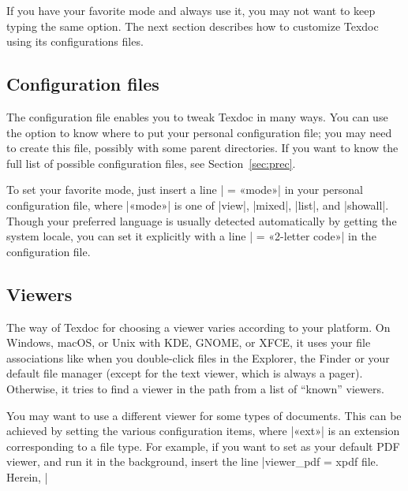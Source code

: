 \documentclass[draft]{texdoc-doc}
\begin{document}
If you have your favorite mode and always use it, you may not want to keep
typing the same option. The next section describes how to customize Texdoc
using its configurations files.

\subsection{Configuration files}
\label{sec:quick-file}

The configuration file enables you to tweak Texdoc in many ways. You can use
the  option to know where to put your personal configuration file;
you may need to create this file, possibly with some parent directories. If you
want to know the full list of possible configuration files, see
Section~\ref{sec:prec}.

To set your favorite mode, just insert a line | = «mode»| in your
personal configuration file, where |«mode»| is one of |view|, |mixed|, |list|,
and |showall|. Though your preferred language is usually detected automatically
by getting the system locale, you can set it explicitly with a line
| = «2-letter code»| in the configuration file.


\subsection{Viewers}
\label{sec:viewer}

The way of Texdoc for choosing a viewer varies according to your platform. On
Windows, macOS, or Unix with KDE, GNOME, or XFCE, it uses your file
associations like when you double-click files in the Explorer, the Finder or
your default file manager (except for the text viewer, which is always a
pager). Otherwise, it tries to find a viewer in the path from a list of
``known'' viewers.

You may want to use a different viewer for some types of documents. This can be
achieved by setting the various  configuration items,
where |«ext»| is an extension corresponding to a file type. For example, if
you want to set  as your default PDF viewer, and run it in the
background, insert the line |viewer_pdf = xpdf %
file. Herein, |%
\end{document}
